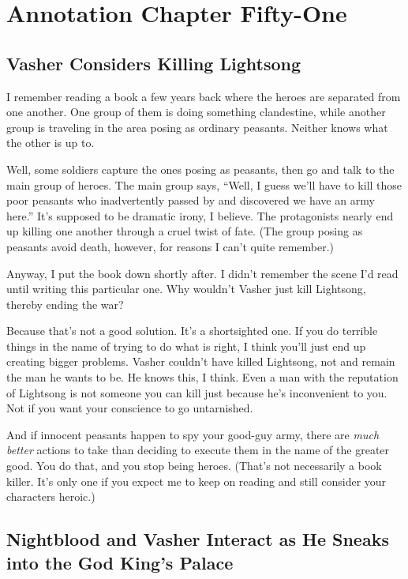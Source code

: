\section{Annotation Chapter Fifty-One}

\subsection*{Vasher Considers Killing Lightsong}

I remember reading a book a few years back where the heroes are separated from one another. One group of them is doing something clandestine, while another group is traveling in the area posing as ordinary peasants. Neither knows what the other is up to.

Well, some soldiers capture the ones posing as peasants, then go and talk to the main group of heroes. The main group says, “Well, I guess we’ll have to kill those poor peasants who inadvertently passed by and discovered we have an army here.” It’s supposed to be dramatic irony, I believe. The protagonists nearly end up killing one another through a cruel twist of fate. (The group posing as peasants avoid death, however, for reasons I can’t quite remember.)

Anyway, I put the book down shortly after. I didn’t remember the scene I’d read until writing this particular one. Why wouldn’t Vasher just kill Lightsong, thereby ending the war?

Because that’s not a good solution. It’s a shortsighted one. If you do terrible things in the name of trying to do what is right, I think you’ll just end up creating bigger problems. Vasher couldn’t have killed Lightsong, not and remain the man he wants to be. He knows this, I think. Even a man with the reputation of Lightsong is not someone you can kill just because he’s inconvenient to you. Not if you want your conscience to go untarnished.

And if innocent peasants happen to spy your good-guy army, there are \textit{much better} actions to take than deciding to execute them in the name of the greater good. You do that, and you stop being heroes. (That’s not necessarily a book killer. It’s only one if you expect me to keep on reading and still consider your characters heroic.)

\subsection*{Nightblood and Vasher Interact as He Sneaks into the God King’s Palace}

